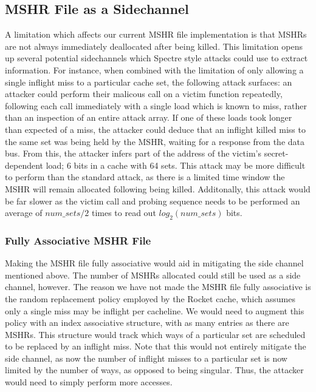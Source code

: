 \subsection{MSHR File as a Sidechannel}
A limitation which affects our current MSHR file implementation is that MSHRs are not always immediately deallocated after being killed. This limitation opens up several potential sidechannels which Spectre style attacks could use to extract information. For instance, when combined with the limitation of only allowing a single inflight miss to a particular cache set, the following attack surfaces: an attacker could perform their malicous call on a victim function repeatedly, following each call immediately with a single load which is known to miss, rather than an inspection of an entire attack array. If one of these loads took longer than expected of a miss, the attacker could deduce that an inflight killed miss to the same set was being held by the MSHR, waiting for a response from the data bus. From this, the attacker infers part of the address of the victim's secret-dependent load; 6 bits in a cache with 64 sets. This attack may be more difficult to perform than the standard attack, as there is a limited time window the MSHR will remain allocated following being killed. Additonally, this attack would be far slower as the victim call and probing sequence needs to be performed an average of $num\_sets/2$ times to read out $log_{2}(num\_sets)$ bits.

\subsubsection{Fully Associative MSHR File}
Making the MSHR file fully associative would aid in mitigating the side channel mentioned above. The number of MSHRs allocated could still be used as a side channel, however. The reason we have not made the MSHR file fully associative is the random replacement policy employed by the Rocket cache, which assumes only a single miss may be inflight per cacheline. We would need to augment this policy with an index associative structure, with as many entries as there are MSHRs. This structure would track which ways of a particular set are scheduled to be replaced by an inflight miss. Note that this would not entirely mitigate the side channel, as now the number of inflight misses to a particular set is now limited by the number of ways, as opposed to being singular. Thus, the attacker would need to simply perform more accesses.

